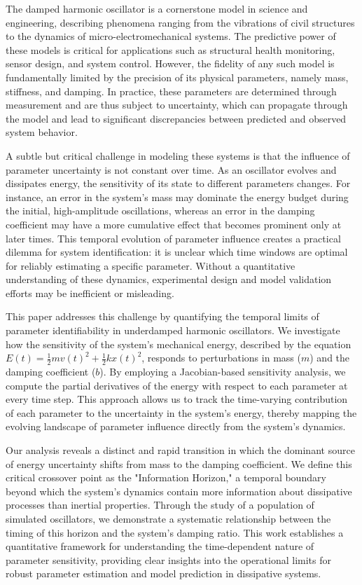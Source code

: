 \documentclass[]{article}
\begin{document}
The damped harmonic oscillator is a cornerstone model in science and engineering, describing phenomena ranging from the vibrations of civil structures to the dynamics of micro-electromechanical systems. The predictive power of these models is critical for applications such as structural health monitoring, sensor design, and system control. However, the fidelity of any such model is fundamentally limited by the precision of its physical parameters, namely mass, stiffness, and damping. In practice, these parameters are determined through measurement and are thus subject to uncertainty, which can propagate through the model and lead to significant discrepancies between predicted and observed system behavior.

A subtle but critical challenge in modeling these systems is that the influence of parameter uncertainty is not constant over time. As an oscillator evolves and dissipates energy, the sensitivity of its state to different parameters changes. For instance, an error in the system's mass may dominate the energy budget during the initial, high-amplitude oscillations, whereas an error in the damping coefficient may have a more cumulative effect that becomes prominent only at later times. This temporal evolution of parameter influence creates a practical dilemma for system identification: it is unclear which time windows are optimal for reliably estimating a specific parameter. Without a quantitative understanding of these dynamics, experimental design and model validation efforts may be inefficient or misleading.

This paper addresses this challenge by quantifying the temporal limits of parameter identifiability in underdamped harmonic oscillators. We investigate how the sensitivity of the system's mechanical energy, described by the equation $E(t) = \frac{1}{2} m v(t)^2 + \frac{1}{2} k x(t)^2$, responds to perturbations in mass ($m$) and the damping coefficient ($b$). By employing a Jacobian-based sensitivity analysis, we compute the partial derivatives of the energy with respect to each parameter at every time step. This approach allows us to track the time-varying contribution of each parameter to the uncertainty in the system's energy, thereby mapping the evolving landscape of parameter influence directly from the system's dynamics.

Our analysis reveals a distinct and rapid transition in which the dominant source of energy uncertainty shifts from mass to the damping coefficient. We define this critical crossover point as the "Information Horizon," a temporal boundary beyond which the system's dynamics contain more information about dissipative processes than inertial properties. Through the study of a population of simulated oscillators, we demonstrate a systematic relationship between the timing of this horizon and the system's damping ratio. This work establishes a quantitative framework for understanding the time-dependent nature of parameter sensitivity, providing clear insights into the operational limits for robust parameter estimation and model prediction in dissipative systems.
\end{document}

